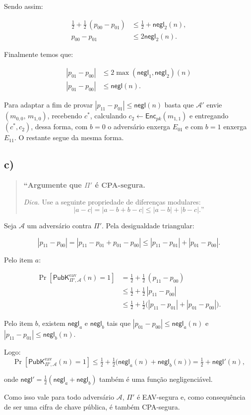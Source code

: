 \documentclass[11pt,a4paper]{article}
\newcommand{\Enc}{\mathsf{Enc}}
\newcommand{\negl}{\mathsf{negl}}
\newcommand{\PubKeav}[3]{\mathsf{PubK}^{\mathrm{eav}}_{#1,#2}(#3)}
\begin{document}
    Sendo assim:

    \begin{align*}
        \tfrac12 + \tfrac12\,(p_{00}-p_{01}) &\le \tfrac12 + \negl_2(n),\\
        p_{00}-p_{01} &\le 2\negl_2(n).
    \end{align*}

    Finalmente temos que:

    \begin{align*}
        |p_{01}-p_{00}| &\le 2\max(\negl_1,\negl_2)(n)\\
        |p_{01}-p_{00}| &\le \negl(n).
    \end{align*}

    Para adaptar a fim de provar $|p_{11}-p_{01}| \le \negl(n)$ basta que
    $\mathcal{A}'$ envie $(m_{0,0},\, m_{1,0})$, recebendo $c^*$, calculando
    $c_2 \leftarrow \Enc_{pk}(m_{1,1})$ e entregando $(c^*, c_2)$, dessa forma, com $b=0$ o
    adversário enxerga $E_{01}$ e com $b=1$ enxerga $E_{11}$.
    O restante segue da mesma forma.

    \clearpage

    \subsection*{c)}

    \begin{quote}\small\bfseries
        ``Argumente que $\Pi'$ é CPA-segura.

        \textit{Dica.} Use a seguinte propriedade de diferenças modulares:
        \[
            |a - c| = |a - b + b - c| \le |a - b| + |b - c|.\text{''}
        \]
    \end{quote}

    Seja $\mathcal{A}$ um adversário contra $\Pi'$.
    Pela desigualdade triangular:

    \[
        |p_{11} - p_{00}| = |p_{11} - p_{01} + p_{01} - p_{00}|
        \le |p_{11} - p_{01}| + |p_{01} - p_{00}|.
    \]

    Pelo item $a$:

    \begin{align*}
        \Pr\!\left[\PubKeav{\Pi'}{\mathcal{A}}{n}=1\right]
        &= \tfrac12 + \tfrac12\,(p_{11} - p_{00})\\
        &\le \tfrac12 + \tfrac12\,|p_{11} - p_{00}|\\
        &\le \tfrac12 + \tfrac12\bigl(|p_{11} - p_{01}| + |p_{01} - p_{00}|\bigr).
    \end{align*}

    Pelo item $b$, existem $\negl_a$ e $\negl_b$ tais que $|p_{01}-p_{00}| \le \negl_a(n)$ e $|p_{11}-p_{01}| \le \negl_b(n)$.

    Logo:
    \[
        \Pr\!\left[\PubKeav{\Pi'}{\mathcal{A}}{n}=1\right]
        \le \tfrac12 + \tfrac12\bigl(\negl_a(n) + \negl_b(n)\bigr)
        = \tfrac12 + \negl'(n),
    \]

    onde $\negl' = \frac12(\negl_a + \negl_b)$ também é uma função negligenciável.

    Como isso vale para todo adversário $\mathcal{A}$, $\Pi'$ é EAV-segura e, como consequência de ser uma cifra
    de chave pública, é também CPA-segura.

    \clearpage
\end{document}

